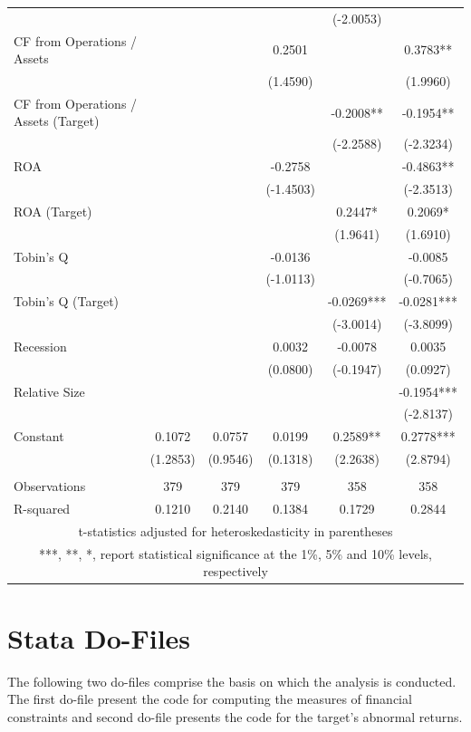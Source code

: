 \documentclass[12pt]{article}
\begin{document}
\begin{appendices}
\begin{table}[!htbp]
\begin{adjustbox}{max width=\textwidth}
\begin{tabular}{lccccc}
			&  &  &  & (-2.0053) &  \\
		   CF from Operations / Assets &  &  & 0.2501 &  & 0.3783** \\
			&  &  & (1.4590) &  & (1.9960) \\
		   CF from Operations / Assets (Target) &  &  &  & -0.2008** & -0.1954** \\
			&  &  &  & (-2.2588) & (-2.3234) \\
		   ROA &  &  & -0.2758 &  & -0.4863** \\
			&  &  & (-1.4503) &  & (-2.3513) \\
		   ROA (Target) &  &  &  & 0.2447* & 0.2069* \\
			&  &  &  & (1.9641) & (1.6910) \\
		   Tobin's Q &  &  & -0.0136 &  & -0.0085 \\
			&  &  & (-1.0113) &  & (-0.7065) \\
		   Tobin's Q (Target) &  &  &  & -0.0269*** & -0.0281*** \\
			&  &  &  & (-3.0014) & (-3.8099) \\
		   Recession &  &  & 0.0032 & -0.0078 & 0.0035 \\
			&  &  & (0.0800) & (-0.1947) & (0.0927) \\
		   Relative Size &  &  &  &  & -0.1954*** \\
			&  &  &  &  & (-2.8137) \\
		   Constant & 0.1072 & 0.0757 & 0.0199 & 0.2589** & 0.2778*** \\
			& (1.2853) & (0.9546) & (0.1318) & (2.2638) & (2.8794) \\
			&  &  &  &  &  \\
		   Observations & 379 & 379 & 379 & 358 & 358 \\
			R-squared & 0.1210 & 0.2140 & 0.1384 & 0.1729 & 0.2844 \\ \hline
			\multicolumn{6}{c}{ t-statistics adjusted for heteroskedasticity in parentheses} \\
			\multicolumn{6}{c}{ ***, **, *, report statistical significance at the 1\%, 5\% and 10\% levels, respectively}\\
		   \end{tabular}						
	\end{adjustbox}
\end{table}
\pagebreak


\section{Stata Do-Files}
The following two do-files comprise the basis on which the analysis is conducted. The first do-file present the code for computing the measures of financial constraints and second do-file presents the code for the target's abnormal returns. 





\end{appendices}

\printbibliography
 
\end{document}
